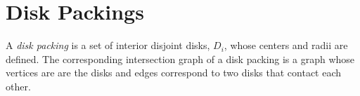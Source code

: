 \section{Disk Packings}

A \textit{disk packing} is a set of interior disjoint disks, $D_i$, whose centers and radii are defined.  The corresponding intersection graph of a disk packing is a graph whose vertices are are the disks and edges correspond to two disks that contact each other.





